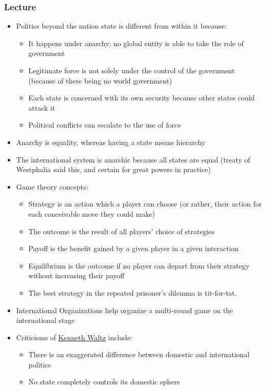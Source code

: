 \documentclass[11pt]{article}
\begin{document}
\subsubsection{Lecture}
\label{sec:org8918972}
\begin{itemize}
\item Politics beyond the nation state is different from within it because:
\begin{itemize}
\item It happens under anarchy; no global entity is able to take the role of government
\item Legitimate force is not solely under the control of the government (because
of there being no world government)
\item Each state is concerned with its own security because other states could
attack it
\item Political conflicts can escalate to the use of force
\end{itemize}
\item Anarchy is equality, whereas having a state means hierarchy
\item The international system is anarchic because all states are equal (treaty of
Westphalia said this, and certain for great powers in practice)
\item Game theory concepts:
\begin{itemize}
\item Strategy is an action which a player can choose (or rather, their action for
each conceivable move they could make)
\item The outcome is the result of all players' choice of strategies
\item Payoff is the benefit gained by a given player in a given interaction
\item Equilibrium is the outcome if no player can depart from their strategy
without increasing their payoff
\item The best strategy in the repeated prisoner's dilemma is tit-for-tat.
\end{itemize}
\item International Organizations help organize a multi-round game on the
international stage
\item Criticisms of \href{20200623140959-kenneth\_waltz.org}{Kenneth Waltz} include:
\begin{itemize}
\item There is an exaggerated difference between domestic and international politics
\item No state completely controls its domestic sphere

\end{itemize}
\end{itemize}
\end{document}
